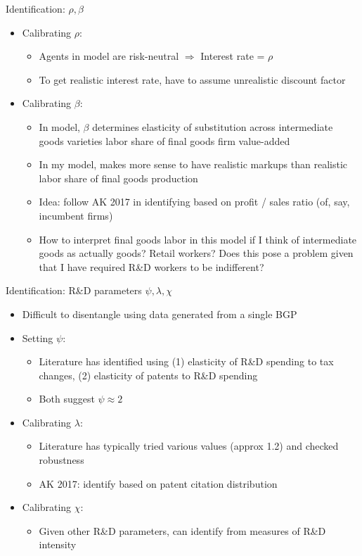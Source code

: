 \documentclass[english,usenames,dvipsnames]{beamer}
\begin{document}
\begin{frame}{Identification: $\rho, \beta$}
\begin{itemize}
	\item Calibrating $\rho$:
	\begin{itemize}
		\item Agents in model are risk-neutral $\Rightarrow$ Interest rate = $\rho$
		\item To get realistic interest rate, have to assume unrealistic discount factor
	\end{itemize}
	\item Calibrating $\beta$:
	\begin{itemize}
		\item In model, $\beta$ determines elasticity of substitution across intermediate goods varieties labor share of final goods firm value-added
		\item In my model, makes more sense to have realistic markups than realistic labor share of final goods production
		\item Idea: follow AK 2017 in identifying based on profit / sales ratio (of, say, incumbent firms)
		\item How to interpret final goods labor in this model if I think of intermediate goods as actually goods? Retail workers? Does this pose a problem given that I have required R\&D workers to be indifferent? 
	\end{itemize}
\end{itemize}
\end{frame}

\begin{frame}{Identification: R\&D parameters $\psi, \lambda, \chi$}
\begin{itemize}
	\item Difficult to disentangle using data generated from a single BGP 
	\item Setting $\psi$:
	\begin{itemize}
		\item Literature has identified using (1) elasticity of R\&D spending to tax changes, (2) elasticity of patents to R\&D spending
		\item Both suggest $\psi \approx 2$
	\end{itemize}
	\item Calibrating $\lambda$:
	\begin{itemize}
		\item Literature has typically tried various values (approx 1.2) and checked robustness
		\item AK 2017: identify based on patent citation distribution
	\end{itemize}
	\item Calibrating $\chi$:
	\begin{itemize}
		\item Given other R\&D parameters, can identify from measures of R\&D intensity  
	\end{itemize}
\end{itemize}
\end{frame}
\end{document}
